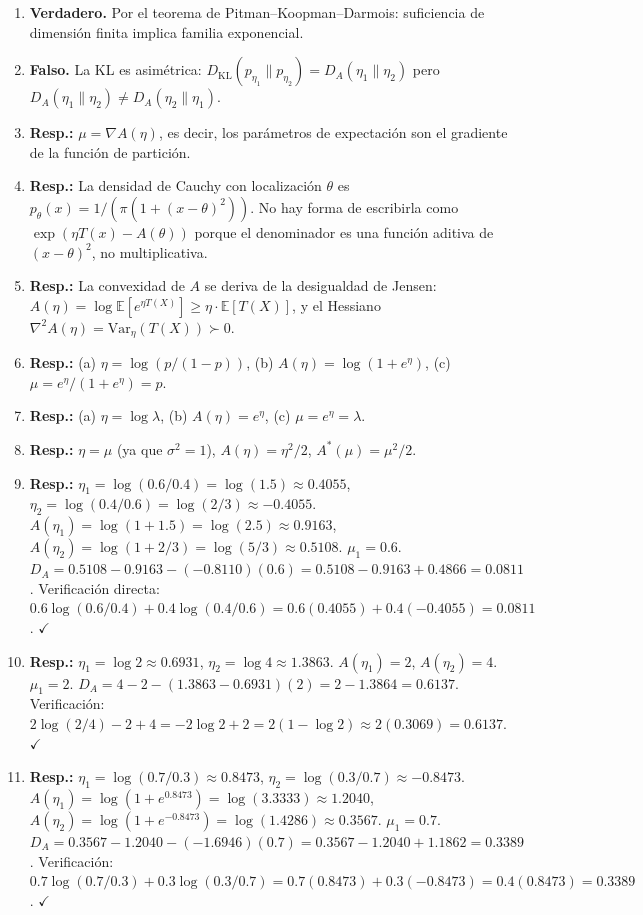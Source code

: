 \begin{enumerate}
	\item \textbf{Verdadero.} Por el teorema de Pitman--Koopman--Darmois: suficiencia de dimensión finita implica familia exponencial.
	\item \textbf{Falso.} La KL es asimétrica: $D_{\mathrm{KL}}(p_{\eta_1} \| p_{\eta_2}) = D_A(\eta_1 \| \eta_2)$ pero $D_A(\eta_1 \| \eta_2) \ne D_A(\eta_2 \| \eta_1)$.
	\item \textbf{Resp.:} $\mu = \nabla A(\eta)$, es decir, los parámetros de expectación son el gradiente de la función de partición.
	\item \textbf{Resp.:} La densidad de Cauchy con localización $\theta$ es $p_\theta(x) = 1/(\pi(1+(x-\theta)^2))$.  No hay forma de escribirla como $\exp(\eta T(x) - A(\theta))$ porque el denominador es una función aditiva de $(x-\theta)^2$, no multiplicativa.
	\item \textbf{Resp.:} La convexidad de $A$ se deriva de la desigualdad de Jensen: $A(\eta) = \log\mathbb{E}[e^{\eta T(X)}] \ge \eta \cdot \mathbb{E}[T(X)]$, y el Hessiano $\nabla^2 A(\eta) = \mathrm{Var}_\eta(T(X)) \succ 0$.
	\item \textbf{Resp.:} (a) $\eta = \log(p/(1-p))$, (b) $A(\eta) = \log(1+e^\eta)$, (c) $\mu = e^\eta/(1+e^\eta) = p$.
	\item \textbf{Resp.:} (a) $\eta = \log\lambda$, (b) $A(\eta) = e^\eta$, (c) $\mu = e^\eta = \lambda$.
	\item \textbf{Resp.:} $\eta = \mu$ (ya que $\sigma^2 = 1$), $A(\eta) = \eta^2/2$, $A^*(\mu) = \mu^2/2$.
	\item \textbf{Resp.:} $\eta_1 = \log(0.6/0.4) = \log(1.5) \approx 0.4055$, $\eta_2 = \log(0.4/0.6) = \log(2/3) \approx -0.4055$.  $A(\eta_1) = \log(1+1.5) = \log(2.5) \approx 0.9163$, $A(\eta_2) = \log(1+2/3) = \log(5/3) \approx 0.5108$.  $\mu_1 = 0.6$.  $D_A = 0.5108 - 0.9163 - (-0.8110)(0.6) = 0.5108 - 0.9163 + 0.4866 = 0.0811$.  Verificación directa: $0.6\log(0.6/0.4) + 0.4\log(0.4/0.6) = 0.6(0.4055) + 0.4(-0.4055) = 0.0811$.  $\checkmark$
	\item \textbf{Resp.:} $\eta_1 = \log 2 \approx 0.6931$, $\eta_2 = \log 4 \approx 1.3863$.  $A(\eta_1) = 2$, $A(\eta_2) = 4$.  $\mu_1 = 2$.  $D_A = 4 - 2 - (1.3863 - 0.6931)(2) = 2 - 1.3864 = 0.6137$.  Verificación: $2\log(2/4) - 2 + 4 = -2\log 2 + 2 = 2(1 - \log 2) \approx 2(0.3069) = 0.6137$.  $\checkmark$
	\item \textbf{Resp.:} $\eta_1 = \log(0.7/0.3) \approx 0.8473$, $\eta_2 = \log(0.3/0.7) \approx -0.8473$.  $A(\eta_1) = \log(1+e^{0.8473}) = \log(3.3333) \approx 1.2040$, $A(\eta_2) = \log(1+e^{-0.8473}) = \log(1.4286) \approx 0.3567$.  $\mu_1 = 0.7$.  $D_A = 0.3567 - 1.2040 - (-1.6946)(0.7) = 0.3567 - 1.2040 + 1.1862 = 0.3389$.  Verificación: $0.7\log(0.7/0.3) + 0.3\log(0.3/0.7) = 0.7(0.8473) + 0.3(-0.8473) = 0.4(0.8473) = 0.3389$.  $\checkmark$

\end{enumerate}
